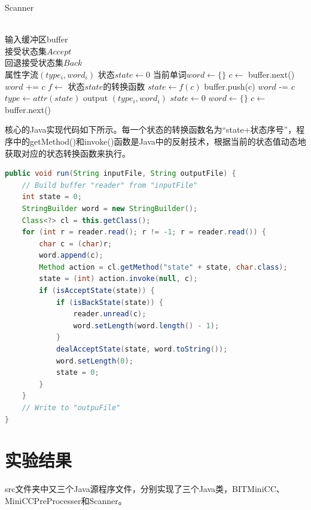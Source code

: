 \documentclass[UTF8, twoside, titlepage]{ctexart}
\begin{document}
\begin{algorithm}[H]
\begin{multicols}{2}
	\caption{Scanner}
	\begin{algorithmic}[1]
		\REQUIRE ~\\
			输入缓冲区buffer\\
			接受状态集$Accept$\\
			回退接受状态集$Back$
		\ENSURE ~\\
			属性字流$(type_i, word_i)$
		\STATE 状态$state \leftarrow 0$
		\STATE 当前单词$word \leftarrow \{\}$
		\STATE $c \leftarrow$ buffer.next()
			\STATE $word$ += $c$
			\STATE $f \leftarrow$ 状态$state$的转换函数
			\STATE $state \leftarrow f(c)$
					\STATE buffer.push(c)
					\STATE $word$ -= $c$
				\ENDIF
				\STATE $type \leftarrow attr(state)$
				\STATE output $(type_i, word_i)$
				\STATE $state \leftarrow 0$
				\STATE $word \leftarrow \{\}$
			\ENDIF
			\STATE $c \leftarrow$ buffer.next()
		\ENDWHILE
	\end{algorithmic}
	\end{multicols}
\end{algorithm}

核心的Java实现代码如下所示。每一个状态的转换函数名为“state+状态序号”，程序中的getMethod()和invoke()函数是Java中的反射技术，根据当前的状态值动态地获取对应的状态转换函数来执行。

\begin{lstlisting}[language=Java]
public void run(String inputFile, String outputFile) {
	// Build buffer "reader" from "inputFile"
	int state = 0;
	StringBuilder word = new StringBuilder();
	Class<?> cl = this.getClass();
	for (int r = reader.read(); r != -1; r = reader.read()) {
		char c = (char)r;
		word.append(c);
		Method action = cl.getMethod("state" + state, char.class);
		state = (int) action.invoke(null, c);
		if (isAcceptState(state)) {
			if (isBackState(state)) {
				reader.unread(c);
				word.setLength(word.length() - 1);
			}
			dealAcceptState(state, word.toString());
			word.setLength(0);
			state = 0;
		}
	}
  	// Write to "outpuFile"	
}
\end{lstlisting}

\section{实验结果}
src文件夹中又三个Java源程序文件，分别实现了三个Java类，BITMiniCC、MiniCCPreProcesser和Scanner。
\end{document}
